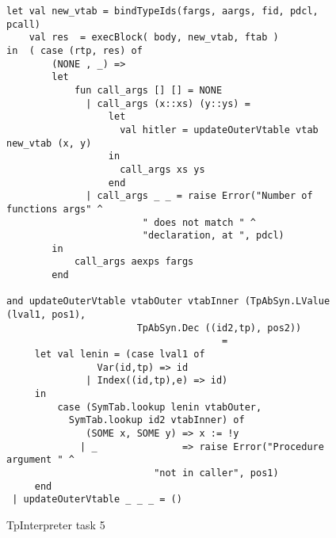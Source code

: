 \documentclass[12pt,a4paper,english]{article}
\begin{document}
\begin{figure}[h]
\begin{lstlisting}
let val new_vtab = bindTypeIds(fargs, aargs, fid, pdcl, pcall)
    val res  = execBlock( body, new_vtab, ftab )
in  ( case (rtp, res) of
        (NONE , _) =>
        let 
            fun call_args [] [] = NONE
              | call_args (x::xs) (y::ys) =
                  let 
                    val hitler = updateOuterVtable vtab new_vtab (x, y)
                  in
                    call_args xs ys
                  end
              | call_args _ _ = raise Error("Number of functions args" ^
					    " does not match " ^ 
					    "declaration, at ", pdcl)
        in 
            call_args aexps fargs  
        end

and updateOuterVtable vtabOuter vtabInner (TpAbSyn.LValue (lval1, pos1), 
					   TpAbSyn.Dec ((id2,tp), pos2)) 
								      = 
     let val lenin = (case lval1 of 
                Var(id,tp) => id
              | Index((id,tp),e) => id)
     in
         case (SymTab.lookup lenin vtabOuter, 
	       SymTab.lookup id2 vtabInner) of
              (SOME x, SOME y) => x := !y
             | _               => raise Error("Procedure argument " ^
					      "not in caller", pos1)
     end
 | updateOuterVtable _ _ _ = ()

\end{lstlisting}
\caption{TpInterpreter task 5}\end{figure}

\newpage
\end{document}

